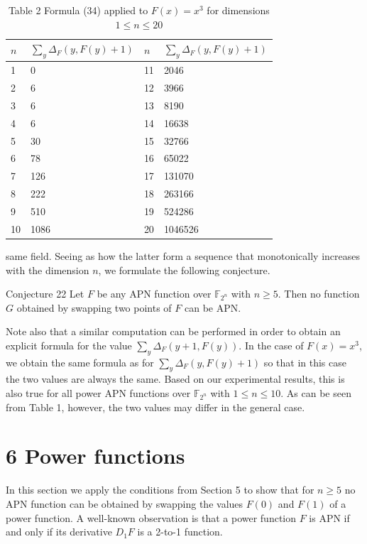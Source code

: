 \documentclass[10pt]{article}
\begin{document}
\begin{table}[h]
\begin{center}
\captionsetup{labelformat=empty}
\caption{Table 2 Formula (34) applied to $F(x)=x^{3}$ for dimensions $1 \leq n \leq 20$}
\begin{tabular}{|l|l|l|l|}
\hline
$n$ & $\sum_{y} \Delta_{F}(y, F(y)+1)$ & $n$ & $\sum_{y} \Delta_{F}(y, F(y)+1)$ \\
\hline
1 & 0 & 11 & 2046 \\
\hline
2 & 6 & 12 & 3966 \\
\hline
3 & 6 & 13 & 8190 \\
\hline
4 & 6 & 14 & 16638 \\
\hline
5 & 30 & 15 & 32766 \\
\hline
6 & 78 & 16 & 65022 \\
\hline
7 & 126 & 17 & 131070 \\
\hline
8 & 222 & 18 & 263166 \\
\hline
9 & 510 & 19 & 524286 \\
\hline
10 & 1086 & 20 & 1046526 \\
\hline
\end{tabular}
\end{center}
\end{table}

same field. Seeing as how the latter form a sequence that monotonically increases with the dimension $n$, we formulate the following conjecture.

Conjecture 22 Let $F$ be any APN function over $\mathbb{F}_{2^{n}}$ with $n \geq 5$. Then no function $G$ obtained by swapping two points of $F$ can be APN.

Note also that a similar computation can be performed in order to obtain an explicit formula for the value $\sum_{y} \Delta_{F}(y+1, F(y))$. In the case of $F(x)=x^{3}$, we obtain the same formula as for $\sum_{y} \Delta_{F}(y, F(y)+1)$ so that in this case the two values are always the same. Based on our experimental results, this is also true for all power APN functions over $\mathbb{F}_{2^{n}}$ with $1 \leq n \leq 10$. As can be seen from Table 1, however, the two values may differ in the general case.

\section*{6 Power functions}
In this section we apply the conditions from Section 5 to show that for $n \geq 5$ no APN function can be obtained by swapping the values $F(0)$ and $F(1)$ of a power function. A well-known observation is that a power function $F$ is APN if and only if its derivative $D_{1} F$ is a 2-to-1 function.
\end{document}
